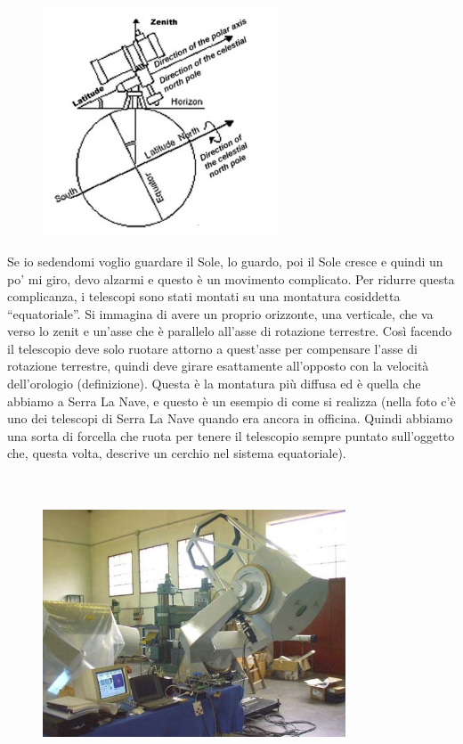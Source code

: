 \documentclass[a4paper,11pt]{article}
\begin{document}
\begin{figure}[h!!]
        \centering
        \includegraphics[width=7cm]{8.jpg}
        \label{}
    \end{figure}

Se io sedendomi voglio guardare il Sole, lo guardo, poi il Sole cresce e quindi un po’ mi giro, devo alzarmi e questo è un movimento complicato. Per ridurre questa complicanza, i telescopi sono stati montati su una montatura cosiddetta “equatoriale”. Si immagina di avere un proprio orizzonte, una verticale, che va verso lo zenit e un’asse che è parallelo all’asse di rotazione terrestre. Così facendo il telescopio deve solo ruotare attorno a quest’asse per compensare l’asse di rotazione terrestre, quindi deve girare esattamente all’opposto con la velocità dell’orologio (definizione). Questa è la montatura più diffusa ed è quella che abbiamo a Serra La Nave, e questo è un esempio di come si realizza (nella foto c’è uno dei telescopi di Serra La Nave quando era ancora in officina. Quindi abbiamo una sorta di forcella che ruota per tenere il telescopio sempre puntato sull’oggetto che, questa volta, descrive un cerchio nel sistema equatoriale).\\\\\\

\begin{figure}[h!!]
        \centering
        \includegraphics[width=9cm]{9.jpg}
        \label{}
    \end{figure}
\end{document}
